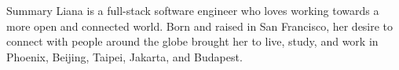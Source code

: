 \documentclass{resume} %
\begin{document}

\begin{rSection}{Summary}
Liana is a full-stack software engineer who loves working towards a more open and connected world. Born and raised in San Francisco, her desire to connect with people around the globe brought her to live, study, and work in Phoenix, Beijing, Taipei, Jakarta, and Budapest.

\end{rSection}

\end{document}

